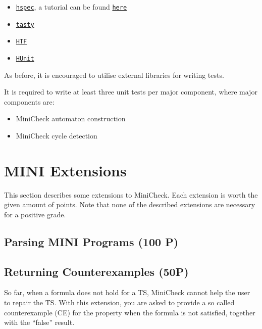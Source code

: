 \documentclass{article}
\begin{document}
\begin{itemize}
\item \href{https://hackage.haskell.org/package/hspec}{\texttt{hspec}}, a tutorial can be found \href{https://hspec.github.io/}{\texttt{here}}
\item \href{https://hackage.haskell.org/package/tasty}{\texttt{tasty}}
\item \href{https://hackage.haskell.org/package/HTF}{\texttt{HTF}}
\item \href{https://hackage.haskell.org/package/HUnit}{\texttt{HUnit}}
\end{itemize}

As before, it is encouraged to utilise external libraries for writing tests.

It is required to write at least three unit tests per major component, where major components are:

\begin{itemize}
\item MiniCheck automaton construction
\item MiniCheck cycle detection
\end{itemize}


\section{MINI Extensions}
This section describes some extensions to MiniCheck. Each extension is worth the given amount of points. 
Note that none of the described extensions are necessary for a positive grade.

\subsection{Parsing MINI Programs (100 P)}

\subsection{Returning Counterexamples (50P)}
So far, when a formula does not hold for a TS, MiniCheck cannot help the user to repair the TS. With 
this extension, you are asked to provide a so called counterexample (CE) for the property when the formula is not 
satisfied, together with the ``false'' result.
\end{document}
